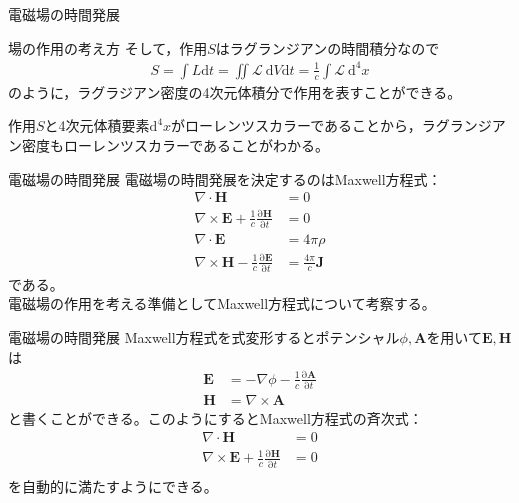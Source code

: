 \documentclass[unicode, aspectratio=169, 12pt]{beamer}
\newcommand{\pdiff}[2]{\frac{\mathrm{\partial} #1}{\mathrm{\partial} #2}} %
\begin{document}
\begin{frame}{電磁場の時間発展}
    \begin{block}{場の作用の考え方}
        そして，作用$S$はラグランジアンの時間積分なので
        \begin{align*}
            S=\int L\mathrm{d}t=\iint\mathcal{L}\>\mathrm{d}V\mathrm{d}t=\frac{1}{c}\int \mathcal{L}\>\mathrm{d}^4x
        \end{align*}
        のように，ラグラジアン密度の4次元体積分で作用を表すことができる。
    \end{block}
    作用$S$と4次元体積要素$\mathrm{d}^4x$がローレンツスカラーであることから，ラグランジアン密度もローレンツスカラーであることがわかる。
\end{frame}

\begin{frame}{電磁場の時間発展}
    電磁場の時間発展を決定するのはMaxwell方程式：
    \begin{align*}
    \nabla \cdot \bm{H} &= 0 \\
    \nabla \times \bm{E}+\frac{1}{c}\pdiff{\bm{H}}{t} &= 0 \\
    \nabla \cdot \bm{E} &= 4\pi\rho \\
    \nabla \times \bm{H}-\frac{1}{c}\pdiff{\bm{E}}{t} &= \frac{4\pi}{c}\bm{J}
    \end{align*}
    である。\\
    電磁場の作用を考える準備としてMaxwell方程式について考察する。
\end{frame}



\begin{frame}{電磁場の時間発展}
    Maxwell方程式を式変形するとポテンシャル$\phi,\bm{A}$を用いて$\bm{E},\bm{H}$は
    \begin{align*}
        \bm{E}&=-\nabla\phi-\frac{1}{c}\pdiff{\bm{A}}{t}\\
        \bm{H}&=\nabla\times\bm{A}
    \end{align*}
    と書くことができる。このようにするとMaxwell方程式の斉次式：
    \begin{align*}
        \nabla \cdot \bm{H} &= 0 \\
        \nabla \times \bm{E}+\frac{1}{c}\pdiff{\bm{H}}{t} &= 0 \\
    \end{align*}
    を自動的に満たすようにできる。
\end{frame}
\end{document}
